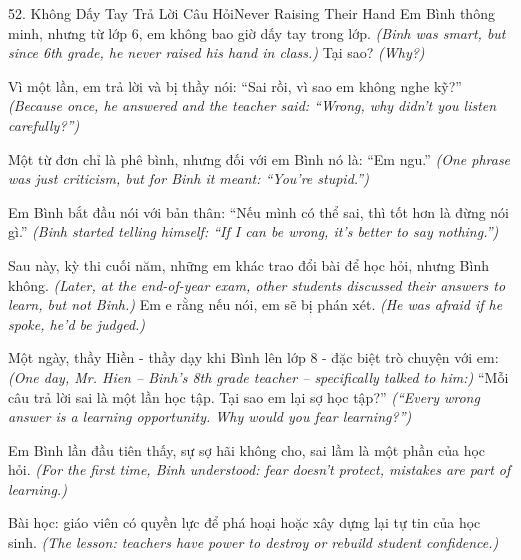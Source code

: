 \begin{truyen}{52. Không Dấy Tay Trả Lời Câu Hỏi}{Never Raising Their Hand}
Em Bình thông minh, nhưng từ lớp 6, em không bao giờ dấy tay trong lớp.
\textit{(Binh was smart, but since 6th grade, he never raised his hand in class.)}
Tại sao?
\textit{(Why?)}

Vì một lần, em trả lời và bị thầy nói: ``Sai rồi, vì sao em không nghe kỹ?''
\textit{(Because once, he answered and the teacher said: ``Wrong, why didn't you listen carefully?'')}

Một từ đơn chỉ là phê bình, nhưng đối với em Bình nó là: ``Em ngu.''
\textit{(One phrase was just criticism, but for Binh it meant: ``You're stupid.'')}

Em Bình bắt đầu nói với bản thân: ``Nếu mình có thể sai, thì tốt hơn là đừng nói gì.''
\textit{(Binh started telling himself: ``If I can be wrong, it's better to say nothing.'')}

Sau này, kỳ thi cuối năm, những em khác trao đổi bài để học hỏi, nhưng Bình không.
\textit{(Later, at the end-of-year exam, other students discussed their answers to learn, but not Binh.)}
Em e rằng nếu nói, em sẽ bị phán xét.
\textit{(He was afraid if he spoke, he'd be judged.)}

Một ngày, thầy Hiền - thầy dạy khi Bình lên lớp 8 - đặc biệt trò chuyện với em:
\textit{(One day, Mr. Hien -- Binh's 8th grade teacher -- specifically talked to him:)}
``Mỗi câu trả lời sai là một lần học tập. Tại sao em lại sợ học tập?''
\textit{(``Every wrong answer is a learning opportunity. Why would you fear learning?'')}

Em Bình lần đầu tiên thấy, sự sợ hãi không cho, sai lầm là một phần của học hỏi.
\textit{(For the first time, Binh understood: fear doesn't protect, mistakes are part of learning.)}

Bài học: giáo viên có quyền lực để phá hoại hoặc xây dựng lại tự tin của học sinh.
\textit{(The lesson: teachers have power to destroy or rebuild student confidence.)}
\end{truyen}

